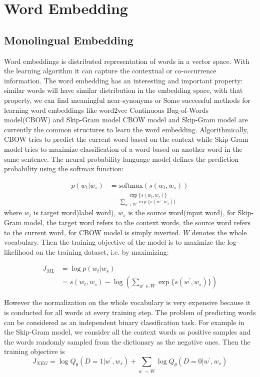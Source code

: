 \chapter{Word Embedding}
\section{Monolingual Embedding}
	Word embeddings is distributed representation of words in a vector space. With the learning algorithm it can capture the contextual or co-occurrence information. The word embedding has an interesting and important property: similar words will have similar distribution in the embedding space, with that property, we can find meaningful near-synonyms or  Some successful methods for learning word embeddings like word2vec  \cite{mikolov2013distributed}
	Continuous Bag-of-Words model(CBOW) and Skip-Gram model
	CBOW model and Skip-Gram model are currently the  common structures to learn the word embedding. Algorithmically,  CBOW tries to predict the current word based on the context while Skip-Gram model tries to maximize classification of a word based on another word in the same sentence.
	The neural probability language model defines the prediction probability using the softmax function:

	
	\begin{align}
	p(w_t | w_s) & = \textrm{softmax} {(s(w_t, w_s))} \\
	& = \frac{\exp\{s(w_t, w_s)\}}{\sum_{w^{\prime} \in W}{\exp\{s( w^{\prime}, w_s)\}}} 
	\end{align}
	where ${w_t}$ is target word)label word), ${w_s}$ is the source word(input word), for Skip-Gram model, the target word refers to the context words, the source word refers to the current word, for CBOW model is simply inverted. ${W}$ denotes the whole vocabulary. Then the training objective of the model is to maximize the log-likelihood on the training dataset, i.e. by maximizing:
	
	\begin{align}
	J_{ML} & = \log p(w_t| w_s)	\\
	& = s(w_t, w_s) - \log(\sum_{w^\prime \in W} {\exp\{s(w^\prime, w_s)\}})	
	\end{align}


	
	However the normalization on the whole vocabulary is very expensive because it is conducted for all words at every training step. The problem of predicting words can be considered as an independent binary classification task. For example in the Skip-Gram model, we consider all the context words as positive samples and the words randomly sampled from the dictionary as the negative ones. Then the training objective is 
	\[J_{NEG} = \log {Q_{\theta}{(D=1 | w^{\prime}, w_s)}} + \sum_{w^{\prime} \sim W} {\log{Q_{\theta}{(D=0 | w^{\prime}, w_s )}}}  \]
	
